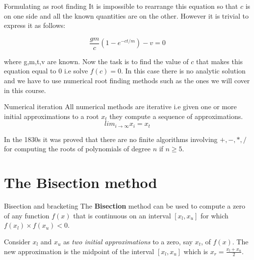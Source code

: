 \documentclass[12pt]{beamer}
\begin{document}
\begin{frame}{Formulating as root finding}
It
is impossible to rearrange this equation so that $c$ is on one side 
and all the known quantities are on the other. However it is trivial 
to express it as follows: 

\begin{equation} 
\frac{gm}{c} (1-e^{-ct/m}) - v = 0 
\end{equation} 

\noindent 
where g,m,t,v are known. Now the task is to find the value of $c$ that 
makes this equation equal to $0$ i.e solve $f(c) = 0$. In this case
there is no analytic solution and we have to use numerical root
finding methods such as the ones we will cover in this course. 
\end{frame} 

\begin{frame}{Numerical iteration} 
All numerical methods are iterative i.e given one or more initial
approximations to a root $x_t$ they compute a sequence of
approximations. 
\begin{equation} 
lim_{i \rightarrow \infty} x_{i} = x_{t} 
\end{equation} 

In the 1830s it was proved that there are no finite algorithms
involving $+,-,*,/$ for computing the roots of polynomials
of degree $n$ if $n \geq 5$. 
\end{frame} 

\section{The Bisection method} 

\begin{frame}{Bisection and bracketing}
The {\bf Bisection} method can be used to compute a zero of any function $f(x)$ that is continuous on an interval $[x_l, x_u]$ for which $f(x_l) \times f(x_u) <0$.  

Consider $x_l$ and $x_u$ as {\it two initial approximations} to a zero, say $x_t$, of $f(x)$. The new approximation is the midpoint of the interval $[x_l, x_u]$ which is $x_r = \frac{x_l+x_u}{2}$.  
\vspace{2 in}
\end{frame}
\end{document}
